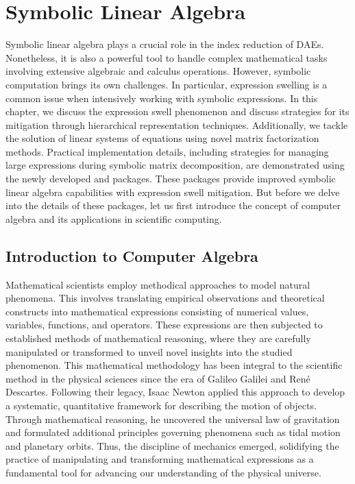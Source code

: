 
\chapter{Symbolic Linear Algebra}
\label{chap2:symbolic_computation}

Symbolic linear algebra plays a crucial role in the index reduction of \acp{DAE}. Nonetheless, it is also a powerful tool to handle complex mathematical tasks involving extensive algebraic and calculus operations. However, symbolic computation brings its own challenges. In particular, expression swelling is a common issue when intensively working with symbolic expressions. In this chapter, we discuss the expression swell phenomenon and discuss strategies for its mitigation through hierarchical representation techniques. Additionally, we tackle the solution of linear systems of equations using novel matrix factorization methods. Practical implementation details, including strategies for managing large expressions during symbolic matrix decomposition, are demonstrated using the newly developed \LEM{} and \LAST{} \Maple{} packages. These packages provide improved symbolic linear algebra capabilities with expression swell mitigation. But before we delve into the details of these packages, let us first introduce the concept of computer algebra and its applications in scientific computing.


\section{Introduction to Computer Algebra}
\label{chap1:sec:cas}

Mathematical scientists employ methodical approaches to model natural phenomena. This involves translating empirical observations and theoretical constructs into mathematical expressions consisting of numerical values, variables, functions, and operators. These expressions are then subjected to established methods of mathematical reasoning, where they are carefully manipulated or transformed to unveil novel insights into the studied phenomenon. This mathematical methodology has been integral to the scientific method in the physical sciences since the era of Galileo Galilei and Ren{\'e} Descartes. Following their legacy, Isaac Newton applied this approach to develop a systematic, quantitative framework for describing the motion of objects. Through mathematical reasoning, he uncovered the universal law of gravitation and formulated additional principles governing phenomena such as tidal motion and planetary orbits. Thus, the discipline of mechanics emerged, solidifying the practice of manipulating and transforming mathematical expressions as a fundamental tool for advancing our understanding of the physical universe.

